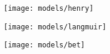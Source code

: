 \begin{figure}[p!]
    \centering

    \begin{subfigure}{0.3\linewidth}
        \parbox[c]{0.1\linewidth}{\caption{}%
            \label{pyg:fgr:henryex}}
        \parbox[b]{0.7\linewidth}{%
            \texttt{[image: models/henry]}}
    \end{subfigure}
    \begin{subfigure}{0.3\linewidth}
        \parbox[c]{0.1\linewidth}{\caption{}%
            \label{pyg:fgr:langmuirex}}
        \parbox[b]{0.7\linewidth}{%
            \texttt{[image: models/langmuir]}}
    \end{subfigure}
    \begin{subfigure}{0.3\linewidth}
        \parbox[c]{0.1\linewidth}{\caption{}%
            \label{pyg:fgr:betex}}
        \parbox[b]{0.7\linewidth}{%
            \texttt{[image: models/bet]}}
    \end{subfigure}
    

\end{figure}
